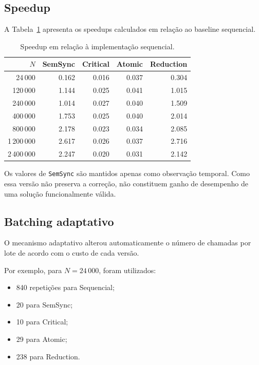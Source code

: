 \subsection{Speedup}

A Tabela~\ref{tab:atvd06-speedup} apresenta os speedups calculados em
relação ao baseline sequencial.

\begin{table}[htbp]
    \centering
    \caption{Speedup em relação à implementação sequencial.}
    \label{tab:atvd06-speedup}
    \small

    \begin{tabular}{r|r|r|r|r}
        \hline
        \(N\) &
        SemSync &
        Critical &
        Atomic &
        Reduction \\
        \hline
        24\,000    & 0.162 & 0.016 & 0.037 & 0.304 \\
        120\,000   & 1.144 & 0.025 & 0.041 & 1.015 \\
        240\,000   & 1.014 & 0.027 & 0.040 & 1.509 \\
        400\,000   & 1.753 & 0.025 & 0.040 & 2.014 \\
        800\,000   & 2.178 & 0.023 & 0.034 & 2.085 \\
        1\,200\,000 & 2.617 & 0.026 & 0.037 & 2.716 \\
        2\,400\,000 & 2.247 & 0.020 & 0.031 & 2.142 \\
        \hline
    \end{tabular}
\end{table}

Os valores de \texttt{SemSync} são mantidos apenas como observação temporal.
Como essa versão não preserva a correção, não constituem ganho de desempenho
de uma solução funcionalmente válida.


\subsection{Batching adaptativo}

O mecanismo adaptativo alterou automaticamente o número de chamadas por
lote de acordo com o custo de cada versão.

Por exemplo, para \(N=24\,000\), foram utilizados:

\begin{itemize}
    \item 840 repetições para Sequencial;
    \item 20 para SemSync;
    \item 10 para Critical;
    \item 29 para Atomic;
    \item 238 para Reduction.
\end{itemize}

